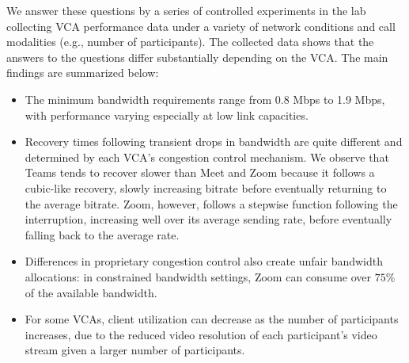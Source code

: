 We answer these questions by a series of controlled experiments in the lab collecting VCA performance data under a variety of network conditions and call modalities (e.g., number of participants). The collected data shows that the answers to the questions differ substantially depending on the VCA. The main findings are summarized below:%
\begin{itemize}[noitemsep]
    \item The minimum bandwidth requirements range from 0.8 Mbps to 1.9 Mbps, with performance varying especially at low link capacities. 
    \item Recovery times following transient drops in bandwidth are quite different and determined by each VCA's congestion control mechanism. We observe that Teams tends to recover slower than Meet and Zoom because it follows a cubic-like recovery, slowly increasing bitrate before eventually returning to the average bitrate. Zoom, however, follows a stepwise function following the interruption, increasing well over its average sending rate, before eventually falling back to the average rate.
    \item Differences in proprietary congestion control also create unfair bandwidth allocations: in constrained bandwidth settings, Zoom can consume over $75\%$ of the available bandwidth.
    \item For some VCAs, client utilization can decrease as the number of participants increases, due to the reduced video resolution of each participant's video stream given a larger number of participants.
\end{itemize}






